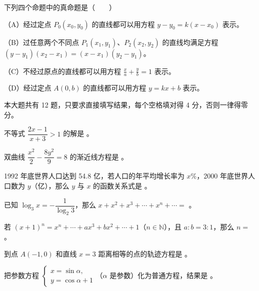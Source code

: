 \begin{question}
下列四个命题中的真命题是\mbox{（　　）}

（A）经过定点 $P_0(x_0,y_0)$ 的直线都可以用方程 $y-y_0=k(x-x_0)$ 表示。

（B）过任意两个不同点 $P_1(x_1,y_1)$、$P_2(x_2,y_2)$ 的直线均满足方程 $(y-y_1)(x_2-x_1)=(x-x_1)(y_2-y_1)$。

（C）不经过原点的直线都可以用方程 $\frac xa+\frac yb=1$ 表示。

（D）经过定点 $A(0,b)$ 的直线都可以用方程 $y=kx+b$ 表示。

\end{question}

本大题共有 12 题，只要求直接填写结果，每个空格填对得 4 分，否则一律得零分。

\begin{question}
不等式 $\dfrac{2x-1}{x+3}>1$ 的解是 \gkblank{}。

\end{question}
\begin{question}
双曲线 $\dfrac{x^2}{2}-\dfrac{8y^2}{9}=8$ 的渐近线方程是 \gkblank{}。

\end{question}
\begin{question}
1992 年底世界人口达到 54.8 亿，若人口的年平均增长率为 $x\%$，2000 年底世界人口数为 $y$（亿），那么 $y$ 与 $x$ 的函数关系式是 \gkblank{}。

\end{question}
\begin{question}
已知 $\log_3x=-\dfrac1{\log_2 3}$，那么 $x+x^2+x^3+\cdots+x^n+\cdots=$ \gkblank{}。

\end{question}
\begin{question}
若 $(x+1)^n=x^n+\cdots+ax^3+bx^2+\cdots+1$（$n\in\mathbb N$），且 $a:b=3:1$，那么 $n=$ \gkblank{}。

\end{question}
\begin{question}
到点 $A(-1,0)$ 和直线 $x=3$ 距离相等的点的轨迹方程是 \gkblank{}。

\end{question}
\begin{question}
把参数方程 $\begin{cases}x=\sin\alpha,\\y=\cos\alpha+1\end{cases}$（$\alpha$ 是参数）化为普通方程，结果是 \gkblank{}。

\end{question}
